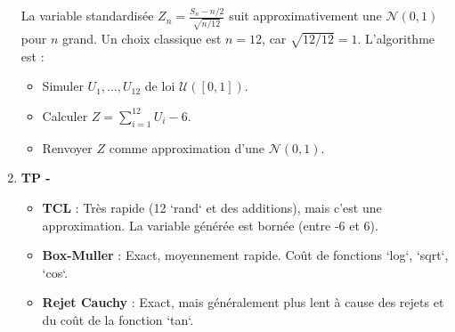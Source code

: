 \documentclass[solutions]{exercices}
\begin{document}
\begin{solution}
\begin{enumerate}
    La variable standardisée $Z_n = \frac{S_n - n/2}{\sqrt{n/12}}$ suit approximativement une $\mathcal{N}(0,1)$ pour $n$ grand.
    Un choix classique est $n=12$, car $\sqrt{12/12}=1$. L'algorithme est :
    \begin{itemize}
        \item Simuler $U_1, \dots, U_{12}$ de loi $\mathcal{U}([0,1])$.
        \item Calculer $Z = \sum_{i=1}^{12} U_i - 6$.
        \item Renvoyer $Z$ comme approximation d'une $\mathcal{N}(0,1)$.
    \end{itemize}
    \item \textbf{TP -}
    \begin{itemize}
        \item \textbf{TCL} : Très rapide (12 `rand` et des additions), mais c'est une approximation. La variable générée est bornée (entre -6 et 6).
        \item \textbf{Box-Muller} : Exact, moyennement rapide. Coût de fonctions `log`, `sqrt`, `cos`.
        \item \textbf{Rejet Cauchy} : Exact, mais généralement plus lent à cause des rejets et du coût de la fonction `tan`.
    \end{itemize}
\end{enumerate}
\end{solution}
\end{document}
